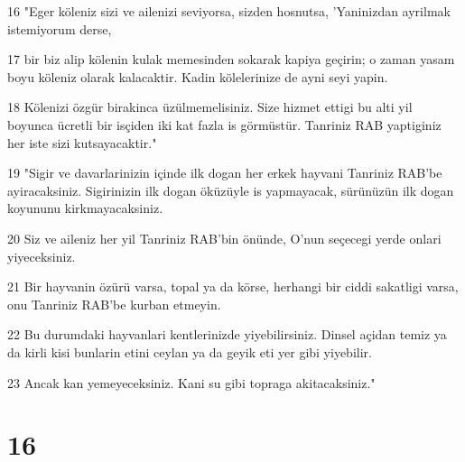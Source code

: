\par 16 "Eger köleniz sizi ve ailenizi seviyorsa, sizden hosnutsa, 'Yaninizdan ayrilmak istemiyorum derse,
\par 17 bir biz alip kölenin kulak memesinden sokarak kapiya geçirin; o zaman yasam boyu köleniz olarak kalacaktir. Kadin kölelerinize de ayni seyi yapin.
\par 18 Kölenizi özgür birakinca üzülmemelisiniz. Size hizmet ettigi bu alti yil boyunca ücretli bir isçiden iki kat fazla is görmüstür. Tanriniz RAB yaptiginiz her iste sizi kutsayacaktir."
\par 19 "Sigir ve davarlarinizin içinde ilk dogan her erkek hayvani Tanriniz RAB'be ayiracaksiniz. Sigirinizin ilk dogan öküzüyle is yapmayacak, sürünüzün ilk dogan koyununu kirkmayacaksiniz.
\par 20 Siz ve aileniz her yil Tanriniz RAB'bin önünde, O'nun seçecegi yerde onlari yiyeceksiniz.
\par 21 Bir hayvanin özürü varsa, topal ya da körse, herhangi bir ciddi sakatligi varsa, onu Tanriniz RAB'be kurban etmeyin.
\par 22 Bu durumdaki hayvanlari kentlerinizde yiyebilirsiniz. Dinsel açidan temiz ya da kirli kisi bunlarin etini ceylan ya da geyik eti yer gibi yiyebilir.
\par 23 Ancak kan yemeyeceksiniz. Kani su gibi topraga akitacaksiniz."

\chapter{16}

